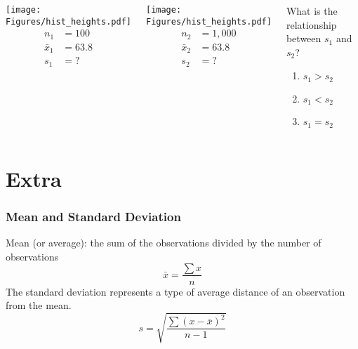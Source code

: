 \begin{frame}
\frametitle{\grp}
\begin{columns}
\begin{center}
\texttt{[image: Figures/hist\_heights.pdf]}\\
\begin{align*}
n_1&=100\\
\bar{x}_1&=63.8\\
s_1&=?
\end{align*}
\end{center}
\begin{center}
\texttt{[image: Figures/hist\_heights.pdf]}\\
\begin{align*}
n_2&=1,000\\
\bar{x}_2&=63.8\\
s_2&=?
\end{align*}
\end{center}
\begin{clicker}{What is the relationship between $s_1$ and $s_2$?}
\begin{enumerate}
\item $s_1 > s_2$
\item $s_1 < s_2$
\item $s_1 = s_2$
\end{enumerate}
\end{clicker}
\end{columns}
\end{frame}


\section[Extra]{Extra}
\begin{frame}
\end{frame}

\begin{frame}[label=meansd]
\frametitle{Mean and Standard Deviation}
 Mean (or average): the sum of the observations divided by the number of observations
\begin{equation*}
   \bar{x} = \frac{\sum{x}}{n}
\end{equation*}
\vskip10pt
The standard deviation represents a type of average distance of an observation from the mean.
\begin{equation*}
   s = \sqrt{\frac{\sum(x-\bar{x})^2}{n-1}}
\end{equation*}
\begin{flushright}
\hyperlink{summarizing}{}
\end{flushright}
\end{frame}

